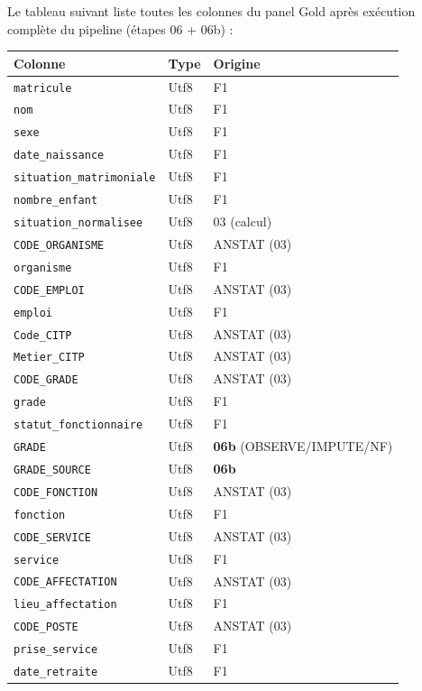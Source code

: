\documentclass[12pt,a4paper,french]{report}
\begin{document}
Le tableau suivant liste toutes les colonnes du panel Gold après exécution
complète du pipeline (étapes 06 + 06b) :

\begin{longtable}{lll}
  \toprule
  \textbf{Colonne} & \textbf{Type} & \textbf{Origine} \\
  \midrule
  \endhead
  \texttt{matricule} & Utf8 & F1 \\
  \texttt{nom} & Utf8 & F1 \\
  \texttt{sexe} & Utf8 & F1 \\
  \texttt{date\_naissance} & Utf8 & F1 \\
  \texttt{situation\_matrimoniale} & Utf8 & F1 \\
  \texttt{nombre\_enfant} & Utf8 & F1 \\
  \texttt{situation\_normalisee} & Utf8 & 03 (calcul) \\
  \texttt{CODE\_ORGANISME} & Utf8 & ANSTAT (03) \\
  \texttt{organisme} & Utf8 & F1 \\
  \texttt{CODE\_EMPLOI} & Utf8 & ANSTAT (03) \\
  \texttt{emploi} & Utf8 & F1 \\
  \texttt{Code\_CITP} & Utf8 & ANSTAT (03) \\
  \texttt{Metier\_CITP} & Utf8 & ANSTAT (03) \\
  \texttt{CODE\_GRADE} & Utf8 & ANSTAT (03) \\
  \texttt{grade} & Utf8 & F1 \\
  \texttt{statut\_fonctionnaire} & Utf8 & F1 \\
  \texttt{GRADE} & Utf8 & \textbf{06b} (OBSERVE/IMPUTE/NF) \\
  \texttt{GRADE\_SOURCE} & Utf8 & \textbf{06b} \\
  \texttt{CODE\_FONCTION} & Utf8 & ANSTAT (03) \\
  \texttt{fonction} & Utf8 & F1 \\
  \texttt{CODE\_SERVICE} & Utf8 & ANSTAT (03) \\
  \texttt{service} & Utf8 & F1 \\
  \texttt{CODE\_AFFECTATION} & Utf8 & ANSTAT (03) \\
  \texttt{lieu\_affectation} & Utf8 & F1 \\
  \texttt{CODE\_POSTE} & Utf8 & ANSTAT (03) \\
  \texttt{prise\_service} & Utf8 & F1 \\
  \texttt{date\_retraite} & Utf8 & F1 \\

\end{longtable}
\end{document}

